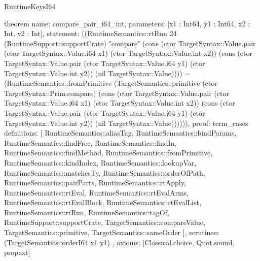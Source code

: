 \begin{lexlean}{RuntimeKeysI64}
\begin{semanticmodule}
theorem{
  name: compare_pair_i64_int,
  parameters: [x1 : Int64, y1 : Int64, x2 : Int, y2 : Int],
  statement: ((RuntimeSemantics::rtRun 24 (RuntimeSupport::supportCrate) "compare" (cons (ctor TargetSyntax::Value.pair (ctor TargetSyntax::Value.i64 x1) (ctor TargetSyntax::Value.int x2)) (cons (ctor TargetSyntax::Value.pair (ctor TargetSyntax::Value.i64 y1) (ctor TargetSyntax::Value.int y2)) (nil TargetSyntax::Value)))) = (RuntimeSemantics::fromPrimitive (TargetSemantics::primitive (ctor TargetSyntax::Prim.compare) (cons (ctor TargetSyntax::Value.pair (ctor TargetSyntax::Value.i64 x1) (ctor TargetSyntax::Value.int x2)) (cons (ctor TargetSyntax::Value.pair (ctor TargetSyntax::Value.i64 y1) (ctor TargetSyntax::Value.int y2)) (nil TargetSyntax::Value)))))),
  proof: term_cases{
    definitions: [
      RuntimeSemantics::aliasTag,
      RuntimeSemantics::bindParams,
      RuntimeSemantics::findFree,
      RuntimeSemantics::findIn,
      RuntimeSemantics::findMethod,
      RuntimeSemantics::fromPrimitive,
      RuntimeSemantics::kindIndex,
      RuntimeSemantics::lookupVar,
      RuntimeSemantics::matchesTy,
      RuntimeSemantics::orderOfPath,
      RuntimeSemantics::pairParts,
      RuntimeSemantics::rtApply,
      RuntimeSemantics::rtEval,
      RuntimeSemantics::rtEvalArms,
      RuntimeSemantics::rtEvalBlock,
      RuntimeSemantics::rtEvalList,
      RuntimeSemantics::rtRun,
      RuntimeSemantics::tagOf,
      RuntimeSupport::supportCrate,
      TargetSemantics::compareValue,
      TargetSemantics::primitive,
      TargetSemantics::sameOrder
    ],
    scrutinee: (TargetSemantics::orderI64 x1 y1)
  },
  axioms: [Classical.choice, Quot.sound, propext]
}


\end{semanticmodule}
\end{lexlean}
